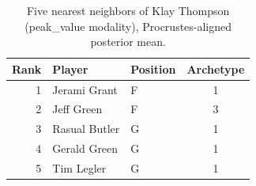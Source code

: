 \begin{table}[htbp]
  \centering\small
  \begin{tabular}{rllc}
    \toprule
    Rank & Player & Position & Archetype \\
    \midrule
    1 & Jerami Grant & F & 1 \\
    2 & Jeff Green & F & 3 \\
    3 & Rasual Butler & G & 1 \\
    4 & Gerald Green & G & 1 \\
    5 & Tim Legler & G & 1 \\
    \bottomrule
  \end{tabular}
  \caption{Five nearest neighbors of Klay Thompson (peak_value modality), Procrustes-aligned posterior mean.}
  \label{tab:Klay_Thompson_neighbors_peak_value}
\end{table}

